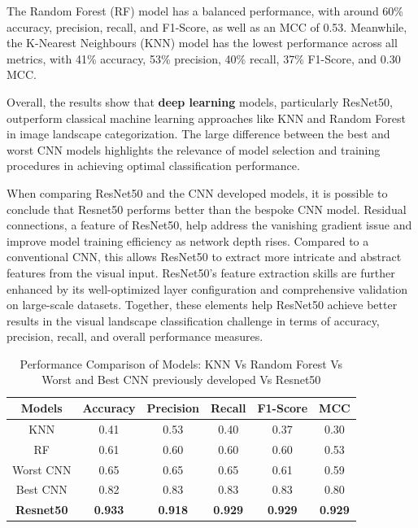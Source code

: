 \documentclass[conference]{IEEEtran}
\begin{document}
The Random Forest (\ac{RF}) model has a balanced performance, with around 60\% accuracy, precision, recall, and F1-Score, as well as an \ac{MCC} of 0.53. Meanwhile, the K-Nearest Neighbours (\ac{KNN}) model has the lowest performance across all metrics, with 41\% accuracy, 53\% precision, 40\% recall, 37\% F1-Score, and 0.30 \ac{MCC}.

Overall, the results show that \textbf{deep learning} models, particularly ResNet50, outperform classical machine learning approaches like \ac{KNN} and Random Forest in image landscape categorization. The large difference between the best and worst \ac{CNN} models highlights the relevance of model selection and training procedures in achieving optimal classification performance.

When comparing ResNet50 and the \ac{CNN} developed models, it is possible to conclude that Resnet50 performs better than the bespoke CNN model. Residual connections, a feature of ResNet50, help address the vanishing gradient issue and improve model training efficiency as network depth rises. Compared to a conventional CNN, this allows ResNet50 to extract more intricate and abstract features from the visual input. ResNet50's feature extraction skills are further enhanced by its well-optimized layer configuration and comprehensive validation on large-scale datasets. Together, these elements help ResNet50 achieve better results in the visual landscape classification challenge in terms of accuracy, precision, recall, and overall performance measures.

\begin{table}[ht]
    \centering  
    \begin{tabular}{|c|c|c|c|c|c|}
    \hline
    \textbf{Models} & \textbf{Accuracy} & \textbf{Precision} & \textbf{Recall} & \textbf{F1-Score} & \textbf{MCC} \\  \hline
    \ac{KNN} & 0.41 & 0.53 & 0.40 & 0.37 & 0.30 \\ \hline
    \ac{RF} & 0.61 & 0.60 & 0.60 & 0.60 & 0.53\\ \hline
    Worst \ac{CNN}               & 0.65            & 0.65                        & 0.65                     & 0.61                      & 0.59       \\ \hline
    Best \ac{CNN}               & 0.82            & 0.83                        & 0.83                & 0.83                        & 0.80 \\ \hline
    \textbf{Resnet50} & \textbf{0.933} & \textbf{0.918} & \textbf{0.929} & \textbf{0.929} & \textbf{0.929} \\ \hline
    \end{tabular}
    \caption{Performance Comparison of Models: KNN Vs Random Forest Vs Worst and Best CNN previously developed Vs Resnet50 }
    \label{tab:comparison_models}
\end{table}
\end{document}
